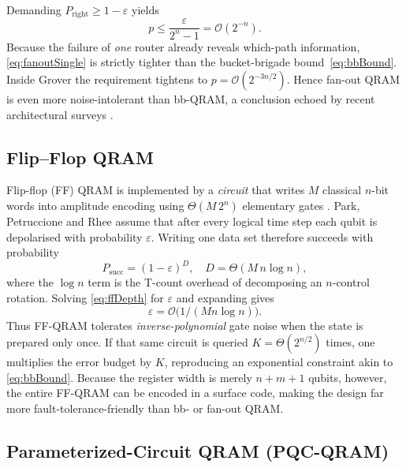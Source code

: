 \documentclass[11pt]{article}
\begin{document}
Demanding \(P_{\mathrm{right}}\ge 1-\varepsilon\) yields
\begin{equation}
   p \le \frac{\varepsilon}{2^{n}-1}
       = \mathcal{O}(2^{-n}).
   \label{eq:fanoutSingle}
\end{equation}
Because the failure of \emph{one} router already reveals which-path
information, \eqref{eq:fanoutSingle} is strictly tighter than the
bucket-brigade bound~\eqref{eq:bbBound}.
Inside Grover the requirement tightens to
\(p=\mathcal{O}(2^{-3n/2})\).
Hence fan-out QRAM is even more noise-intolerant than bb-QRAM, a
conclusion echoed by recent architectural surveys
\cite{Phalak2023,Morales2023}.



\subsection{Flip--Flop QRAM}
\label{ssec:ff}

Flip-flop (FF) QRAM is implemented by a \emph{circuit} that writes
\(M\) classical \(n\)-bit words into amplitude encoding using
\(\Theta(M\,2^{n})\) elementary gates
\cite{Park2019}.
Park, Petruccione and Rhee assume that after every logical time step
each qubit is depolarised with probability \(\varepsilon\).  
Writing one data set therefore succeeds with probability
\begin{equation}
   P_{\mathrm{succ}}
      =(1-\varepsilon)^{D},
      \quad
      D=\Theta(M\,n\log n),
   \label{eq:ffDepth}
\end{equation}
where the \(\log n\) term is the T-count overhead of decomposing an
\(n\)-control rotation.  
Solving \eqref{eq:ffDepth} for \(\varepsilon\) and expanding gives
\[
   \varepsilon
      = \mathcal{O}\!\bigl(1/(M n\log n)\bigr).
\]
Thus FF-QRAM tolerates \emph{inverse-polynomial} gate noise when the
state is prepared only once.  
If that same circuit is queried \(K=\Theta(2^{n/2})\) times,
one multiplies the error budget by \(K\), reproducing an exponential
constraint akin to \eqref{eq:bbBound}.  
Because the register width is merely \(n+m+1\) qubits, however, the
entire FF-QRAM can be encoded in a surface code, making the design far
more fault-tolerance-friendly than bb- or fan-out QRAM.



\subsection{Parameterized-Circuit QRAM (PQC-QRAM)}
\label{ssec:pqc}
\end{document}
